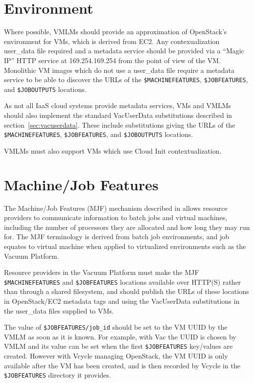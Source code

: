 \documentclass[12pt,a4paper]{article}
\begin{document}
\section{Environment}
\label{sec:env}

Where possible, VMLMs should provide an approximation of OpenStack's 
environment for VMs, which is derived from EC2. Any contexualization 
user\_data file required and a metadata service should be provided via a 
``Magic IP'' 
HTTP service at 169.254.169.254 from the point of view of the VM. 
Monolithic VM images which do not use a user\_data file require a 
metadata service to be able to discover the 
URLs of the \texttt{\$MACHINEFEATURES}, \texttt{\$JOBFEATURES}, and 
\texttt{\$JOBOUTPUTS} locations.

As not all IaaS cloud systems provide metadata services, VMs and VMLMs 
should also implement the standard VacUserData substitutions described 
in section~\ref{sec:vacuserdata}. These include substitutions giving the 
URLs of the \texttt{\$MACHINEFEATURES}, \texttt{\$JOBFEATURES}, and 
\texttt{\$JOBOUTPUTS} locations.

VMLMs must also support VMs which use Cloud Init contextualization.

\section{Machine/Job Features}
\label{sec:mjf}

The Machine/Job Features (MJF) mechanism described in \cite{HSF-MJF} allows
resource providers to communicate information to batch jobs and virtual
machines, including the number of processors they are allocated and
how long they may run for. The MJF terminology is derived from batch
job environments, and job equates to virtual machine when applied to
virtualized environments such as the Vacuum Platform. 

Resource providers in the Vacuum Platform must make the MJF
\texttt{\$MACHINEFEATURES} and \texttt{\$JOBFEATURES} locations
available over HTTP(S) rather than through a shared filesystem, and
should publish the URLs of these locations in OpenStack/EC2 metadata 
tags and using the VacUserData substitutions in the user\_data files
supplied to VMs.

The value of \texttt{\$JOBFEATURES/job\_id} should be set to the VM UUID by
the VMLM as soon as it is known. For example, with Vac the UUID is
chosen by VMLM and its value can be set when the first
\texttt{\$JOBFEATURES}
key/values are created. However with Vcycle managing OpenStack, the
VM UUID is only available after the VM has been created, and is then
recorded by Vcycle in the \texttt{\$JOBFEATURES} directory it provides.
\end{document}
